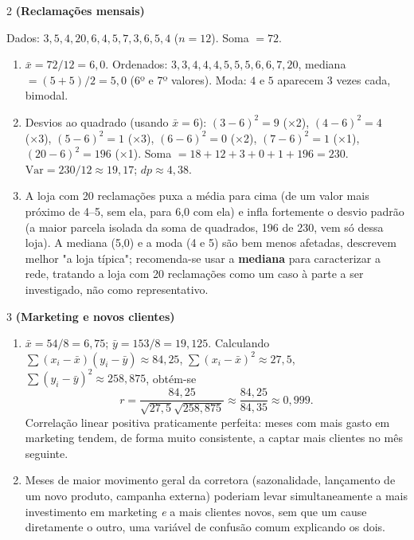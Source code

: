 \documentclass[11pt]{article}
\begin{document}
\begin{questao}{2} \textbf{(Reclamações mensais)}
\begin{solucao}
Dados: $3,5,4,20,6,4,5,7,3,6,5,4$ ($n=12$). Soma $=72$.
\begin{enumerate}[label=(\alph*)]
  \item $\bar x = 72/12 = 6{,}0$. Ordenados: $3,3,4,4,4,5,5,5,6,6,7,20$, mediana
    $=(5+5)/2=5{,}0$ (6º e 7º valores). Moda: $4$ e $5$ aparecem 3 vezes cada, bimodal.
  \item Desvios ao quadrado (usando $\bar x=6$): $(3-6)^2{=}9$ (×2), $(4-6)^2{=}4$ (×3),
    $(5-6)^2{=}1$ (×3), $(6-6)^2{=}0$ (×2), $(7-6)^2{=}1$ (×1), $(20-6)^2{=}196$ (×1). Soma
    $=18+12+3+0+1+196=230$. $\mathrm{Var} = 230/12\approx 19{,}17$; $dp\approx 4{,}38$.
  \item A loja com 20 reclamações puxa a média para cima (de um valor mais próximo de 4--5, sem
    ela, para 6,0 com ela) e infla fortemente o desvio padrão (a maior parcela isolada da soma de
    quadrados, 196 de 230, vem só dessa loja). A mediana (5,0) e a moda (4 e 5) são bem menos
    afetadas, descrevem melhor "a loja típica"; recomenda-se usar a \textbf{mediana} para
    caracterizar a rede, tratando a loja com 20 reclamações como um caso à parte a ser investigado,
    não como representativo.
\end{enumerate}
\end{solucao}
\end{questao}

\begin{questao}{3} \textbf{(Marketing e novos clientes)}
\begin{solucao}
\begin{enumerate}[label=(\alph*)]
  \item $\bar x = 54/8 = 6{,}75$; $\bar y = 153/8 = 19{,}125$. Calculando
    $\sum(x_i-\bar x)(y_i-\bar y) \approx 84{,}25$, $\sum(x_i-\bar x)^2 \approx 27{,}5$,
    $\sum(y_i-\bar y)^2 \approx 258{,}875$, obtém-se
    $$
    r = \frac{84{,}25}{\sqrt{27{,}5}\sqrt{258{,}875}} \approx \frac{84{,}25}{84{,}35} \approx 0{,}999.
    $$
    Correlação linear positiva praticamente perfeita: meses com mais gasto em marketing tendem,
    de forma muito consistente, a captar mais clientes no mês seguinte.
  \item Meses de maior movimento geral da corretora (sazonalidade, lançamento de um novo produto,
    campanha externa) poderiam levar simultaneamente a mais investimento em marketing \emph{e} a
    mais clientes novos, sem que um cause diretamente o outro, uma variável de confusão comum
    explicando os dois.
\end{enumerate}
\end{solucao}
\end{questao}
\end{document}

